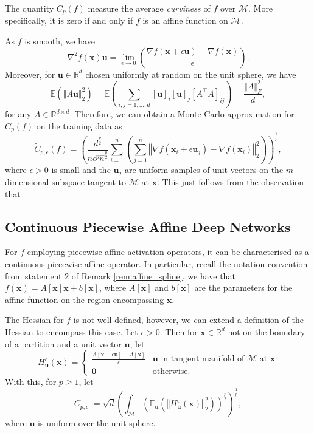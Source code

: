 The quantity $C_p(f)$ measure the average \emph{curviness} of $f$ over $\mathcal{M}$. More specifically, it is zero if and only if $f$ is an affine function on $\mathcal{M}$.

As $f$ is smooth, we have $$\nabla^2f(\mathbf{x})\mathbf{u}=\lim_{\epsilon\to0}\left(\frac{\nabla f(\mathbf{x}+\epsilon\mathbf{u})-\nabla f(\mathbf{x})}{\epsilon}\right).$$Moreover, for $\mathbf{u}\in\mathbb{R}^d$ chosen uniformly at random on the unit sphere, we have $$\mathbb{E}\left(\left\Vert A\mathbf{u}\right\Vert_2^2\right)=\mathbb{E}\left(\sum_{i,j=1,\dots,d}[\mathbf{u}]_i[\mathbf{u}]_j\left[A^\top A\right]_{ij}\right)=\frac{\Vert A\Vert_F^2}{d},$$for any $A\in\mathbb{R}^{d\times d}$. Therefore, we can obtain a Monte Carlo approximation for $C_p(f)$ on the training data as $$\tilde{C}_{p,\epsilon}(f)=\left(\frac{d^{\frac{p}{2}}}{n\epsilon^p\hat{n}^{\frac{p}{2}}}\sum_{i=1}^n\left(\sum_{j=1}^{\hat{n}}\left\Vert\nabla f\left(\mathbf{x}_i+\epsilon\mathbf{u}_j\right)-\nabla f\left(\mathbf{x}_i\right)\right\Vert_2^2\right)\right)^{\frac{1}{p}},$$where $\epsilon>0$ is small and the $\mathbf{u}_j$ are uniform samples of unit vectors on the $m$-dimensional subspace tangent to $\mathcal{M}$ at $\mathbf{x}$. This just follows from the observation that $$$$

\subsection{Continuous Piecewise Affine Deep Networks}

For $f$ employing piecewise affine activation operators, it can be characterised as a continuous piecewise affine operator. In particular, recall the notation convention from statement 2 of Remark \ref{rem:affine_spline}, we have that $f(\mathbf{x})=A[\mathbf{x}]\mathbf{x}+b[\mathbf{x}]$, where $A[\mathbf{x}]$ and $b[\mathbf{x}]$ are the parameters for the affine function on the region encompassing $\mathbf{x}$.

The Hessian for $f$ is not well-defined, however, we can extend a definition of the Hessian to encompass this case. Let $\epsilon>0$. Then for $\mathbf{x}\in\mathbb{R}^d$ not on the boundary of a partition and a unit vector $\mathbf{u}$, let $$H^{\epsilon}_{\mathbf{u}}(\mathbf{x})=\begin{cases}\frac{A\left[\mathbf{x}+\epsilon\mathbf{u}\right]-A[\mathbf{x}]}{\epsilon}&\mathbf{u}\text{ in tangent manifold of }\mathcal{M}\text{ at }\mathbf{x}\\\mathbf{0}&\text{otherwise}.\end{cases}$$With this, for $p\geq1$, let $$C_{p,\epsilon}:=\sqrt{d}\left(\int_{\mathcal{M}}\left(\mathbb{E}_{\mathbf{u}}\left(\left\Vert H_{\mathbf{u}}^{\epsilon}(\mathbf{x})\right\Vert_2^2\right)\right)^{\frac{p}{2}}\right)^{\frac{1}{p}},$$where $\mathbf{u}$ is uniform over the unit sphere.

